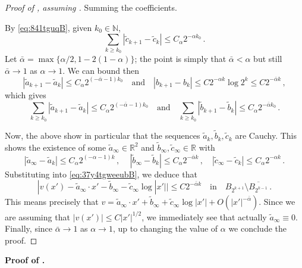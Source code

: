 \documentclass{article}
\newcommand{\N}{\mathbb{N}}
\newcommand{\R}{\mathbb{R}}
\theoremstyle{definition}
\begin{document}
\begin{proof}[Proof of , assuming ]
 Summing the coefficients.

By \eqref{eq:841tguqB}, given $k_0\in \N$, 
$$\sum_{k\geq k_0}|\widetilde c_{k+1}-\widetilde c_k|\leq C_\alpha 2^{-\alpha k_0}\,.$$
Let $\bar \alpha=\max\{\alpha/2,1-2(1-\alpha)\}$; the point is simply that $\bar \alpha<\alpha$ but still $\bar\alpha\to 1$ as $\alpha\to 1$. We can bound then
$$|\widetilde a_{k+1}-\widetilde a_k|\leq C_\alpha 2^{(-\bar\alpha-1)k_0}\quad\mbox{and}\quad|b_{k+1}-b_k|\leq C 2^{- \alpha k}\log 2^k\leq C2^{-\bar\alpha k}\,,$$
which gives
$$\sum_{k\geq k_0}|\widetilde a_{k+1}-\widetilde a_k|\leq C_\alpha 2^{(-\bar \alpha-1) k_0}\quad\mbox{and}\quad \sum_{k\geq k_0} |\widetilde b_{k+1}-\widetilde b_k|\leq C_\alpha 2^{-\bar \alpha k_0}\,.$$


Now, the above show in particular that the sequences $\widetilde a_k,\widetilde b_k,\widetilde c_k$ are Cauchy. This shows the existence of some $\widetilde a_\infty\in\R^2$ and $\widetilde b_\infty, \widetilde c_\infty\in\R$ with
\begin{equation}\label{eq:q7toagvgB}
    |\widetilde a_\infty-\widetilde a_k|\leq C_\alpha 2^{(-\alpha-1)k}\,,\quad\,|\widetilde b_\infty-\widetilde b_k|\leq C_\alpha 2^{-\bar\alpha k}\,,\quad |\widetilde c_\infty-\widetilde c_k|\leq C_\alpha 2^{-\alpha k}\,.
\end{equation}
Substituting into \eqref{eq:37y4tgweeubB}, we deduce that
\begin{equation*}
    |v(x')-\widetilde a_\infty\cdot x'-\widetilde b_\infty-\widetilde c_\infty\log |x'||\leq  C 2^{-\bar\alpha k}\quad\mbox{in}\quad B_{2^{k+1}}\setminus \overline{B_{2^{k-1}}}\,.
\end{equation*}
This means precisely that $v=\widetilde a_\infty\cdot x'+\widetilde b_\infty+\widetilde c_\infty\log |x'|+O(|x'|^{-\bar\alpha})$. Since we are assuming that $|v(x')|\leq C|x'|^{1/2}$, we immediately see that actually $\widetilde a_\infty\equiv 0$. Finally, since $\bar\alpha\to 1$ as $\alpha\to 1$, up to changing the value of $\alpha$ we conclude the proof.
\end{proof}

{\bf Proof of .}
\end{document}
